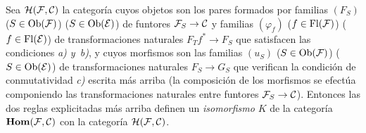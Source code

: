 \begin{proposition}
\label{VI.12.1}
Sea $\cal{H}(\cal{F},\cal{C})$ la categoría cuyos objetos son los pares
formados por familias $(F_S)$
{($S\in\Ob(\cal{F})$)}
{($S\in\Ob(\cal{E})$)}
de funtores $\cal{F}_S\to\cal{C}$ y familias $(\varphi_f)$
{($f\in\Fl(\cal{F})$)}
{($f\in\Fl(\cal{E})$)}
de transformaciones naturales $F_Tf^*\to F_S$ que satisfacen las
condiciones \emph{a) y~b)}, y cuyos morfismos son las familias $(u_S)$
{($S\in\Ob(\cal{F})$)}
{($S\in\Ob(\cal{E})$)}
de transformaciones naturales
$F_S\to G_S$ que verifican la condición de conmutatividad \emph{c)}
escrita más arriba (la composición de los morfismos se efectúa componiendo
las transformaciones naturales entre funtores $\cal{F}_S\to\cal{C}$).
Entonces las dos reglas explicitadas más arriba definen un
\emph{isomorfismo} $K$ de la categoría
$\SheafHom(\cal{F},\cal{C})$ con la categoría
$\cal{H}(\cal{F},\cal{C})$.
\end{proposition}

